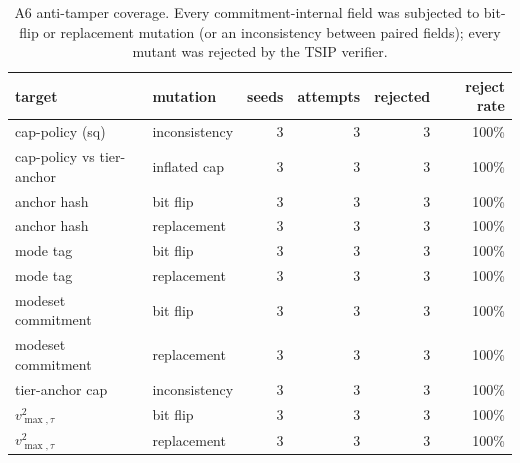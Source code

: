 \begin{table}[t]
\centering
\caption{A6 anti-tamper coverage. Every commitment-internal field was subjected to bit-flip or replacement mutation (or an inconsistency between paired fields); every mutant was rejected by the TSIP verifier.}
\label{tab:a6-malleability}
\small
\begin{tabular}{llrrrr}
\toprule
target & mutation & seeds & attempts & rejected & reject rate \\
\midrule
cap-policy (sq) & inconsistency & 3 & 3 & 3 & 100\% \\
cap-policy vs tier-anchor & inflated cap & 3 & 3 & 3 & 100\% \\
anchor hash & bit flip & 3 & 3 & 3 & 100\% \\
anchor hash & replacement & 3 & 3 & 3 & 100\% \\
mode tag & bit flip & 3 & 3 & 3 & 100\% \\
mode tag & replacement & 3 & 3 & 3 & 100\% \\
modeset commitment & bit flip & 3 & 3 & 3 & 100\% \\
modeset commitment & replacement & 3 & 3 & 3 & 100\% \\
tier-anchor cap & inconsistency & 3 & 3 & 3 & 100\% \\
$v_{\max,\tau}^2$ & bit flip & 3 & 3 & 3 & 100\% \\
$v_{\max,\tau}^2$ & replacement & 3 & 3 & 3 & 100\% \\
\bottomrule
\end{tabular}
\end{table}
